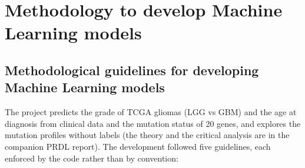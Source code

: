 \section{Methodology to develop Machine Learning models}

\subsection{Methodological guidelines for developing Machine Learning models}

The project predicts the grade of TCGA gliomas (LGG vs GBM) and the age at diagnosis from clinical
data and the mutation status of 20 genes, and explores the mutation profiles without labels (the
theory and the critical analysis are in the companion PRDL report). The development followed five
guidelines, each enforced by the code rather than by convention:

